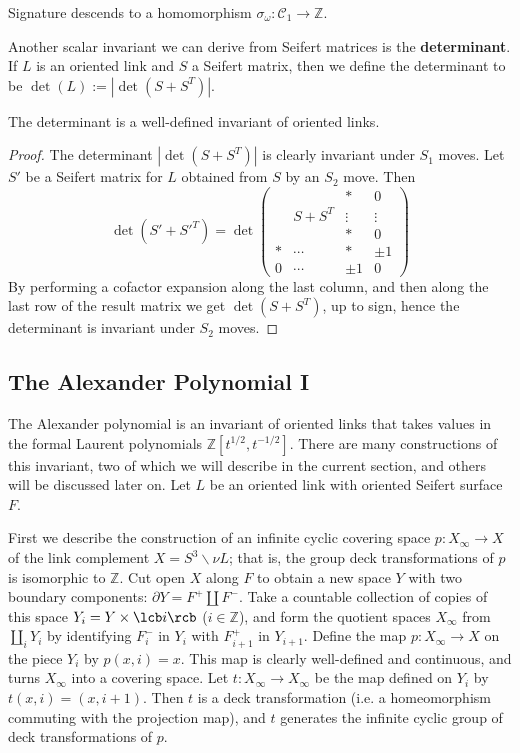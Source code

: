 \begin{cor}
Signature descends to a homomorphism $\sigma_\omega : \mathcal C_1 \rightarrow \mathbb Z$.
\end{cor}

Another scalar invariant we can derive from Seifert matrices is the \textbf{determinant}. If $L$ is an oriented link and $S$ a Seifert matrix, then we define the determinant to be $\det(L) := |\det(S+S^T)|$. 
\begin{prop}
The determinant is a well-defined invariant of oriented links.
\end{prop}
\begin{proof}
The determinant $|\det(S+S^T)|$ is clearly invariant under $S_1$ moves. Let $S'$ be a Seifert matrix for $L$ obtained from $S$ by an $S_2$ move. Then
\[ \det(S'+S'^T) = \det\begin{pmatrix} & & * & 0 \\ & S+S^T & \vdots & \vdots \\ & & * & 0 \\ * & \cdots & * & \pm 1 \\ 0 & \cdots & \pm 1 & 0 \end{pmatrix} \]
By performing a cofactor expansion along the last column, and then along the last row of the result matrix we get $\det(S+S^T)$, up to sign, hence the determinant is invariant under $S_2$ moves.
\end{proof}







\subsection{The Alexander Polynomial I}
\label{The Alexander Polynomial I}


The Alexander polynomial is an invariant of oriented links that takes values in the formal Laurent polynomials $\mathbb Z[t^{1/2},t^{-1/2}]$. There are many constructions of this invariant, two of which we will describe in the current section, and others will be discussed later on. Let $L$ be an oriented link with oriented Seifert surface $F$.

First we describe the construction of an infinite cyclic covering space $p : X_\infty \rightarrow X$ of the link complement $X = S^3 \backslash \nu L$; that is, the group deck transformations of $p$ is isomorphic to $\mathbb Z$. Cut open $X$ along $F$ to obtain a new space $Y$ with two boundary components: $\partial Y = F^+ \coprod F^-$. Take a countable collection of copies of this space $Y_i = Y \times \lcb i \rcb$ ($i \in \mathbb Z$), and form the quotient spaces $X_\infty$ from $\coprod_i Y_i$ by identifying $F_i^-$ in $Y_i$ with $F_{i+1}^+$ in $Y_{i+1}$. Define the map $p : X_\infty \rightarrow X$ on the piece $Y_i$ by $p(x,i) = x$. This map is clearly well-defined and continuous, and turns $X_\infty$ into a covering space. Let $t : X_\infty \rightarrow X_\infty$ be the map defined on $Y_i$ by $t(x,i) = (x,i+1)$. Then $t$ is a deck transformation (i.e. a homeomorphism commuting with the projection map), and $t$ generates the infinite cyclic group of deck transformations of $p$. 

